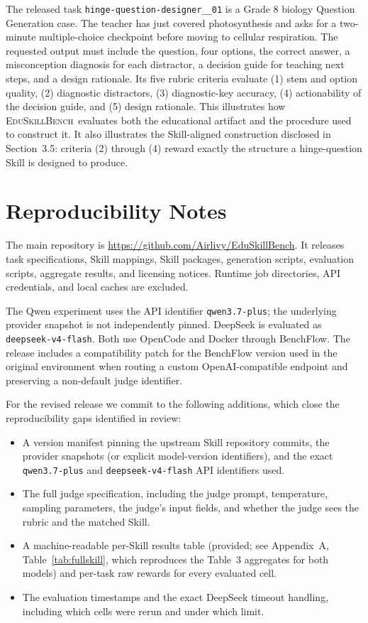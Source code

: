\documentclass[10pt]{article}
\newcommand{\bench}{\textsc{EduSkillBench}\xspace}
\begin{document}
The released task \texttt{hinge-question-designer\_\_01} is a Grade 8 biology Question Generation case. The teacher has just covered photosynthesis and asks for a two-minute multiple-choice checkpoint before moving to cellular respiration. The requested output must include the question, four options, the correct answer, a misconception diagnosis for each distractor, a decision guide for teaching next steps, and a design rationale. Its five rubric criteria evaluate (1) stem and option quality, (2) diagnostic distractors, (3) diagnostic-key accuracy, (4) actionability of the decision guide, and (5) design rationale. This illustrates how \bench~evaluates both the educational artifact and the procedure used to construct it. It also illustrates the Skill-aligned construction disclosed in Section~3.5: criteria (2) through (4) reward exactly the structure a hinge-question Skill is designed to produce.

\section{Reproducibility Notes}

The main repository is \url{https://github.com/Airlivy/EduSkillBench}. It releases task specifications, Skill mappings, Skill packages, generation scripts, evaluation scripts, aggregate results, and licensing notices. Runtime job directories, API credentials, and local caches are excluded.

The Qwen experiment uses the API identifier \texttt{qwen3.7-plus}; the underlying provider snapshot is not independently pinned. DeepSeek is evaluated as \texttt{deepseek-v4-flash}. Both use OpenCode and Docker through BenchFlow. The release includes a compatibility patch for the BenchFlow version used in the original environment when routing a custom OpenAI-compatible endpoint and preserving a non-default judge identifier.

For the revised release we commit to the following additions, which close the reproducibility gaps identified in review:
\begin{itemize}
  \item A version manifest pinning the upstream Skill repository commits, the provider snapshots (or explicit model-version identifiers), and the exact \texttt{qwen3.7-plus} and \texttt{deepseek-v4-flash} API identifiers used.
  \item The full judge specification, including the judge prompt, temperature, sampling parameters, the judge's input fields, and whether the judge sees the rubric and the matched Skill.
  \item A machine-readable per-Skill results table (provided; see Appendix~A, Table~\ref{tab:fullskill}, which reproduces the Table~3 aggregates for both models) and per-task raw rewards for every evaluated cell.
  \item The evaluation timestamps and the exact DeepSeek timeout handling, including which cells were rerun and under which limit.
\end{itemize}
\end{document}

